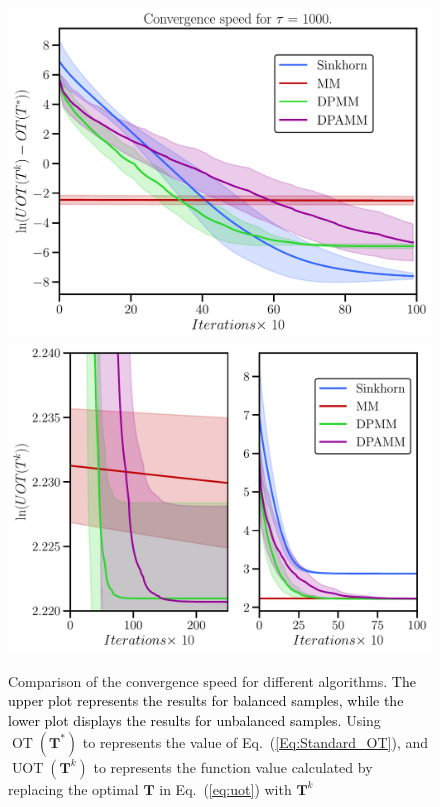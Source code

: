 \documentclass[conference]{IEEEtran}
\newcommand{\mat}[1]{\mathbf{#1}}
\newcommand{\changeSX}[1]{\textcolor{black}{#1}}
\begin{document}
\begin{figure}[t]
\centering
\includegraphics[width = 0.99\linewidth]{pic/ex1}
\centering
\includegraphics[width = 0.99\linewidth]{pic/ex3}
\caption{Comparison of the convergence speed for different algorithms. \changeSX{The upper plot represents the results for balanced samples, while the lower plot displays the results for unbalanced samples.} Using $\operatorname{OT}(\mat T^{*})$ to represents the value of {Eq.~(\ref{Eq:Standard_OT})}, and $\operatorname{UOT}(\mat T^{k})$ to represents the function value calculated by replacing the optimal $\mat T$ in {Eq.~(\ref{eq:uot})} with $\mat T^{k}$ }
\label{Fig:ex1}
\end{figure}
\end{document}
